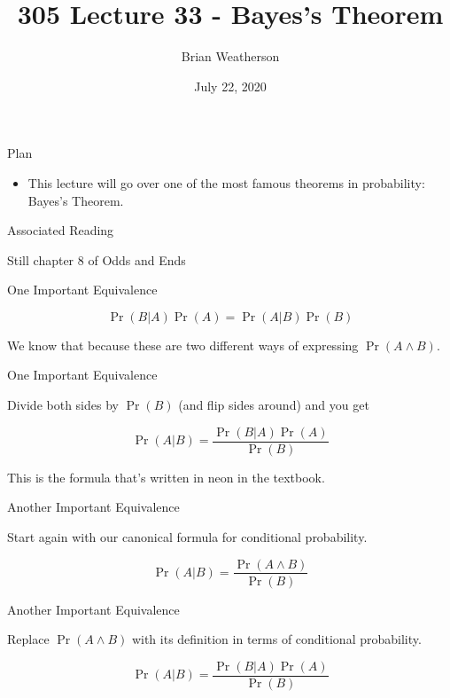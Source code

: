 \documentclass[
  ignorenonframetext,
]{beamer}
\title{305 Lecture 33 - Bayes's Theorem}
\author{Brian Weatherson}
\date{July 22, 2020}
\providecommand{\tightlist}{%
  \setlength{\itemsep}{0pt}\setlength{\parskip}{0pt}}
\renewcommand{\,}{\text{, }}
\begin{document}
\frame{\titlepage}

\begin{frame}{Plan}
\protect\hypertarget{plan}{}

\begin{itemize}
\tightlist
\item
  This lecture will go over one of the most famous theorems in
  probability: Bayes's Theorem.
\end{itemize}

\end{frame}

\begin{frame}{Associated Reading}
\protect\hypertarget{associated-reading}{}

Still chapter 8 of Odds and Ends

\end{frame}

\begin{frame}{One Important Equivalence}
\protect\hypertarget{one-important-equivalence}{}

\[
\Pr(B | A) \Pr(A) = \Pr(A | B) \Pr(B)
\]

We know that because these are two different ways of expressing
\(\Pr(A \wedge B)\).

\end{frame}

\begin{frame}{One Important Equivalence}
\protect\hypertarget{one-important-equivalence-1}{}

Divide both sides by \(\Pr(B)\) (and flip sides around) and you get

\[
\Pr(A | B) = \frac{\Pr(B | A) \Pr(A)}{\Pr(B)}
\]

\pause

This is the formula that's written in neon in the textbook.

\end{frame}

\begin{frame}{Another Important Equivalence}
\protect\hypertarget{another-important-equivalence}{}

Start again with our canonical formula for conditional probability.

\[
\Pr(A | B) = \frac{\Pr(A \wedge B)}{\Pr(B)}
\]

\end{frame}

\begin{frame}{Another Important Equivalence}
\protect\hypertarget{another-important-equivalence-1}{}

Replace \(\Pr(A \wedge B)\) with its definition in terms of conditional
probability.

\[
\Pr(A | B) = \frac{\Pr(B | A)\Pr(A)}{\Pr(B)}
\]

\end{frame}
\end{document}
